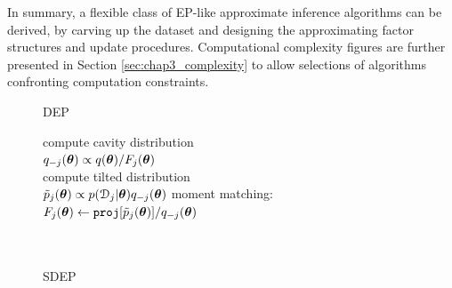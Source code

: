 In summary, a flexible class of EP-like approximate inference algorithms can be derived, by carving up the dataset and designing the approximating factor structures and update procedures. Computational complexity figures are further presented in Section \ref{sec:chap3_complexity} to allow selections of algorithms confronting computation constraints.

\begin{figure}[t]
\begin{minipage}[t]{0.32\linewidth}
\centering
\begin{algorithm}[H] 
\caption{DEP} \small
\label{alg:dep} 
\begin{algorithmic}[1]
	\STATE compute cavity distribution \\$q_{-j}(\bm{\theta}) \propto q(\bm{\theta}) / F_j(\bm{\theta})$ \\  
	\STATE compute tilted distribution \\$\tilde{p}_j(\bm{\theta}) \propto p(\mathcal{D}_j|\bm{\theta}) q_{-j}(\bm{\theta})$
	\STATE moment matching: \\ \hspace{-5mm}$F_j(\bm{\theta}) \leftarrow \mathtt{proj}[\tilde{p}_j(\bm{\theta})] / q_{-j}(\bm{\theta}) $ \\
\hspace{1mm}\\ \vspace{12.2mm} \hspace{1mm}\\
\end{algorithmic}
\end{algorithm}
\end{minipage}
\begin{minipage}[t]{0.32\linewidth}
\centering
\begin{algorithm}[H]
\caption{SDEP} \small
\label{alg:sdep} 
\begin{algorithmic}[1] 


\end{algorithmic}
\end{algorithm}
\end{minipage}
\end{figure}
